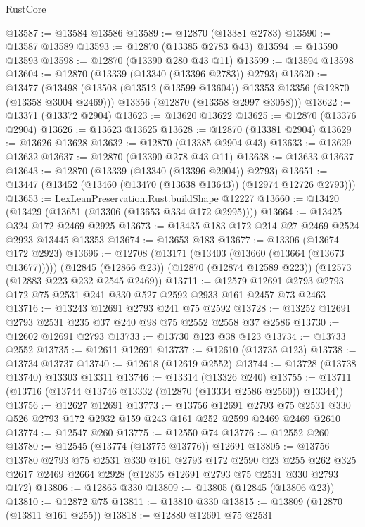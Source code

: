 \begin{lexlean}{RustCore}
\begin{coremodule}
@13587 := @13584 @13586
@13589 := @12870 (@13381 @2783)
@13590 := @13587 @13589
@13593 := @12870 (@13385 @2783 @43)
@13594 := @13590 @13593
@13598 := @12870 (@13390 @280 @43 @11)
@13599 := @13594 @13598
@13604 := @12870 (@13339 (@13340 (@13396 @2783)) @2793)
@13620 := @13477
    (@13498
      (@13508 (@13512 (@13599 @13604)) @13353 @13356 (@12870 (@13358 @3004 @2469)))
      @13356
      (@12870 (@13358 @2997 @3058)))
@13622 := @13371 (@13372 @2904)
@13623 := @13620 @13622
@13625 := @12870 (@13376 @2904)
@13626 := @13623 @13625
@13628 := @12870 (@13381 @2904)
@13629 := @13626 @13628
@13632 := @12870 (@13385 @2904 @43)
@13633 := @13629 @13632
@13637 := @12870 (@13390 @278 @43 @11)
@13638 := @13633 @13637
@13643 := @12870 (@13339 (@13340 (@13396 @2904)) @2793)
@13651 := @13447 (@13452 (@13460 (@13470 (@13638 @13643)) (@12974 @12726 @2793)))
@13653 := LexLeanPreservation.Rust.buildShape @12227
@13660 := @13420 (@13429 (@13651 (@13306 (@13653 @334 @172 @2995))))
@13664 := @13425 @324 @172 @2469 @2925
@13673 := @13435 @183 @172 @214 @27 @2469 @2524 @2923 @13445 @13353
@13674 := @13653 @183
@13677 := @13306 (@13674 @172 @2923)
@13696 := @12708
    (@13171 (@13403 (@13660 (@13664 (@13673 @13677)))))
    (@12845 (@12866 @23))
    (@12870 (@12874 @12589 @223))
    (@12573 (@12883 @223 @232 @2545 @2469))
@13711 := @12579 @12691 @2793 @2793 @172 @75 @2531 @241 @330 @527 @2592 @2933 @161 @2457 @73 @2463
@13716 := @13243 @12691 @2793 @241 @75 @2592
@13728 := @13252 @12691 @2793 @2531 @235 @37 @240 @98 @75 @2552 @2558 @37 @2586
@13730 := @12602 @12691 @2793
@13733 := @13730 @123 @38 @123
@13734 := @13733 @2552
@13735 := @12611 @12691
@13737 := @12610 (@13735 @123)
@13738 := @13734 @13737
@13740 := @12618 (@12619 @2552)
@13744 := @13728 (@13738 @13740) @13303 @13311
@13746 := @13314 (@13326 @240)
@13755 := @13711 (@13716 (@13744 @13746 @13332 (@12870 (@13334 @2586 @2560)) @13344))
@13756 := @12627 @12691
@13773 := @13756
    @12691
    @2793
    @75
    @2531
    @330
    @526
    @2793
    @172
    @2932
    @159
    @243
    @161
    @252
    @2599
    @2469
    @2469
    @2610
@13774 := @12547 @260
@13775 := @12550 @74
@13776 := @12552 @260
@13780 := @12545 (@13774 (@13775 @13776)) @12691
@13805 := @13756
    @13780
    @2793
    @75
    @2531
    @330
    @161
    @2793
    @172
    @2590
    @23
    @255
    @262
    @325
    @2617
    @2469
    @2664
    @2928
    (@12835 @12691 @2793 @75 @2531 @330 @2793 @172)
@13806 := @12865 @330
@13809 := @13805 (@12845 (@13806 @23))
@13810 := @12872 @75
@13811 := @13810 @330
@13815 := @13809 (@12870 (@13811 @161 @255))
@13818 := @12880 @12691 @75 @2531

\end{coremodule}
\end{lexlean}

